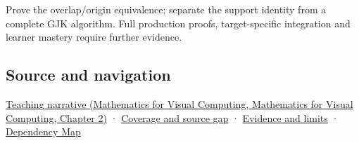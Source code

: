 Prove the overlap/origin equivalence; separate the support identity from a complete GJK algorithm. Full production proofs, target-specific integration and learner mastery require further evidence.

\subsection{Source and navigation}\label{appendix-215ac7099a82-source-and-navigation}

\href{../02-Mathematics-for-Visual-Computing/main.pdf\#nameddest=01-foundations-i-ch018-weighted-points-lead-from-affine-geometry-to-collision-shapes}{Teaching narrative (Mathematics for Visual Computing, Mathematics for Visual Computing, Chapter 2)} · \hyperref[appendix-fd090d982a15-phase-6---parts-501-600]{Coverage and source gap} · \hyperref[appendix-a103e7846d21-phase-6---source-analysis-and-verification]{Evidence and limits} · \hyperref[appendix-4ad47bdd269a]{Dependency Map}

